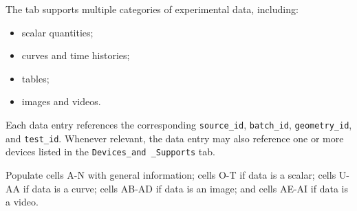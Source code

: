 \documentclass[11pt]{book}
\begin{document}
The tab supports multiple categories of experimental data, including:

\begin{itemize}
\item scalar quantities;
\item curves and time histories;
\item tables;
\item images and videos.
\end{itemize}

Each data entry references the corresponding \texttt{source\_id},
\texttt{batch\_id}, \texttt{geometry\_id}, and \texttt{test\_id}.
Whenever relevant, the data entry may also reference one or more devices listed in the
\texttt{Devices\_and \_Supports} tab. 

Populate cells A-N with general information; cells O-T if data is a scalar; cells U-AA if data is a curve; cells AB-AD if data is an image; and cells AE-AI if data is a video. 
\end{document}
